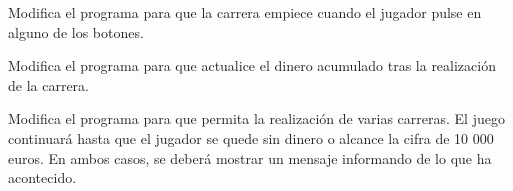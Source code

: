 \begin{exercise}
	Modifica el programa para que la carrera empiece cuando el jugador pulse en alguno de los botones.	
\end{exercise}

\begin{exercise}
	Modifica el programa para que actualice el dinero acumulado tras la realización de la carrera.
\end{exercise}

\begin{exercise}
	Modifica el programa para que permita la realización de varias carreras. El juego continuará hasta que el jugador se quede sin dinero o alcance la cifra de 10 000 euros. En ambos casos, se deberá mostrar un mensaje informando de lo que ha acontecido.
\end{exercise}

